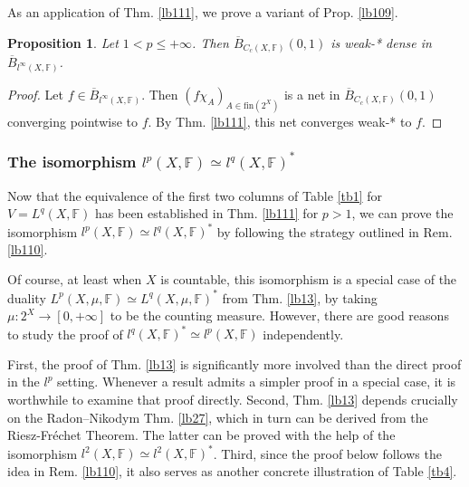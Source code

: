 \documentclass[12pt,b5paper,notitlepage]{article}
\theoremstyle{definition}
\theoremstyle{plain}
\newtheorem{pp}[df]{Proposition}
\newcommand{\ovl}{\overline}
\newcommand{\fin}{\mathrm{fin}}
\newcommand{\Fbb}{\mathbb F}
\numberwithin{equation}{section}
\begin{document}
As an application of Thm. \ref{lb111}, we prove a variant of Prop. \ref{lb109}.

\begin{pp}
Let $1<p\leq+\infty$. Then $\ovl B_{C_c(X,\Fbb)}(0,1)$ is weak-* dense in $\ovl B_{l^\infty(X,\Fbb)}$.
\end{pp}


\begin{proof}
Let $f\in \ovl B_{l^\infty(X,\Fbb)}$. Then $(f\chi_A)_{A\in\fin(2^X)}$ is a net in $\ovl B_{C_c(X,\Fbb)}(0,1)$ converging pointwise to $f$. By Thm. \ref{lb111}, this net converges weak-* to $f$. 
\end{proof}


\subsubsection{The isomorphism $l^p(X,\Fbb)\simeq l^q(X,\Fbb)^*$}


Now that the equivalence of the first two columns of Table \ref{tb1} for $V=L^q(X,\Fbb)$ has been established in Thm. \ref{lb111} for $p>1$, we can prove the isomorphism $l^p(X,\Fbb)\simeq l^q(X,\Fbb)^*$ by following the strategy outlined in Rem. \ref{lb110}. 

Of course, at least when $X$ is countable, this isomorphism is a special case of the duality $L^p(X,\mu,\Fbb)\simeq L^q(X,\mu,\Fbb)^*$ from Thm. \ref{lb13}, by taking $\mu:2^X\rightarrow[0,+\infty]$ to be the counting measure. However, there are good reasons to study the proof of $l^q(X,\Fbb)^*\simeq l^p(X,\Fbb)$ independently. 

First, the proof of Thm. \ref{lb13} is significantly more involved than the direct proof in the $l^p$ setting. Whenever a result admits a simpler proof in a special case, it is worthwhile to examine that proof directly. Second, Thm. \ref{lb13} depends crucially on the Radon–Nikodym Thm. \ref{lb27}, which in turn can be derived from the Riesz-Fr\'echet Theorem. The latter can be proved with the help of the isomorphism $l^2(X,\Fbb)\simeq l^2(X,\Fbb)^*$. Third, since the proof below follows the idea in Rem. \ref{lb110}, it also serves as another concrete illustration of Table \ref{tb4}.


\end{document}
